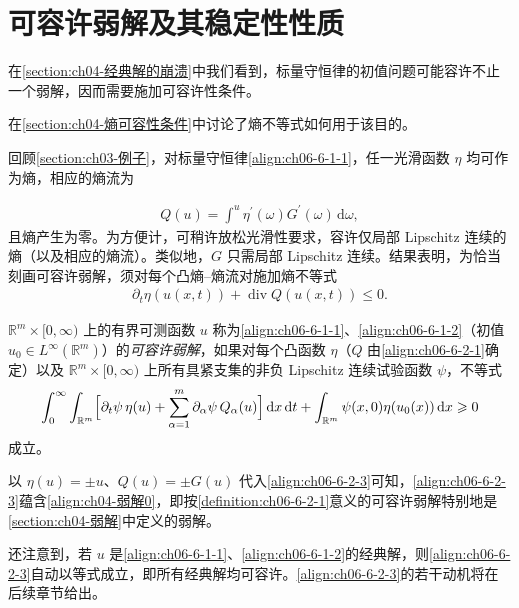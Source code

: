 \documentclass[../../main.tex]{subfiles}
\begin{document}
\section{可容许弱解及其稳定性性质}\label{section:ch06-可容许弱解稳定性}

在\cref{section:ch04-经典解的崩溃}中我们看到，标量守恒律的初值问题可能容许不止一个弱解，因而需要施加可容许性条件。

在\cref{section:ch04-熵可容性条件}中讨论了熵不等式如何用于该目的。

回顾\cref{section:ch03-例子}，对标量守恒律\eqref{align:ch06-6-1-1}，任一光滑函数 $\eta$ 均可作为熵，相应的熵流为

\begin{align}
Q(u)=\int^{u}\eta^{\prime}(\omega)G^{\prime}(\omega)\,\mathrm{d}\omega,
\label{align:ch06-6-2-1}
\end{align}
且熵产生为零。为方便计，可稍许放松光滑性要求，容许仅局部 Lipschitz 连续的熵（以及相应的熵流）。类似地，$G$ 只需局部 Lipschitz 连续。结果表明，为恰当刻画可容许弱解，须对每个凸熵--熵流对施加熵不等式
\begin{align}
\partial_{t}\eta(u(x,t))+\operatorname{div}Q(u(x,t))\leqslant 0.
\label{align:ch06-6-2-2}
\end{align}

\begin{definition}\label{definition:ch06-6-2-1}
$\mathbb{R}^{m}\times[0,\infty)$ 上的有界可测函数 $u$ 称为\eqref{align:ch06-6-1-1}、\eqref{align:ch06-6-1-2}（初值 $u_{0}\in L^{\infty}(\mathbb{R}^{m})$）的\emph{可容许弱解}，如果对每个凸函数 $\eta$（$Q$ 由\eqref{align:ch06-6-2-1}确定）以及 $\mathbb{R}^{m}\times[0,\infty)$ 上所有具紧支集的非负 Lipschitz 连续试验函数 $\psi$，不等式
\begin{align}
\int_{0}^{\infty}\int_{\mathbb{R}^{m}}\Bigl{[}\partial_{t}\psi\,\eta(u)+\sum_{\alpha=1}^{m}\partial_{\alpha}\psi\,Q_{\alpha}(u)\Bigr{]}\,\mathrm{d}x\,\mathrm{d}t+\int_{\mathbb{R}^{m}}\psi(x,0)\eta(u_{0}(x))\,\mathrm{d}x\geqslant 0
\label{align:ch06-6-2-3}
\end{align}
成立。
\end{definition}

以 $\eta(u)=\pm u$、$Q(u)=\pm G(u)$ 代入\eqref{align:ch06-6-2-3}可知，\eqref{align:ch06-6-2-3}蕴含\eqref{align:ch04-弱解0}，即按\cref{definition:ch06-6-2-1}意义的可容许弱解特别地是\cref{section:ch04-弱解}中定义的弱解。

还注意到，若 $u$ 是\eqref{align:ch06-6-1-1}、\eqref{align:ch06-6-1-2}的经典解，则\eqref{align:ch06-6-2-3}自动以等式成立，即所有经典解均可容许。\eqref{align:ch06-6-2-3}的若干动机将在后续章节给出。
\end{document}
